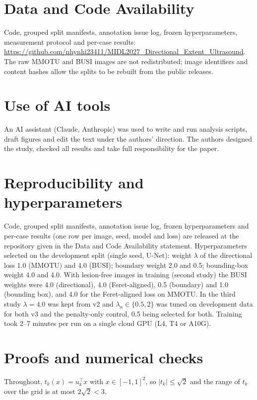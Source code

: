 \documentclass{midl}
\begin{document}
\section*{Data and Code Availability}
Code, grouped split manifests, annotation issue log, frozen hyperparameters, measurement protocol and per-case results: \url{https://github.com/nhynhi23411/MIDL2027_Directional_Extent_Ultrasound}. The raw MMOTU and BUSI images are not redistributed; image identifiers and content hashes allow the splits to be rebuilt from the public releases.

\section*{Use of AI tools}
An AI assistant (Claude, Anthropic) was used to write and run analysis scripts, draft figures and edit the text under the authors' direction. The authors designed the study, checked all results and take full responsibility for the paper.




\appendix
\section{Reproducibility and hyperparameters}\label{app:repro}
Code, grouped split manifests, annotation issue log, frozen hyperparameters and per-case results (one row per image, seed, model and loss) are released at the repository given in the Data and Code Availability statement. Hyperparameters selected on the development split (single seed, U-Net): weight $\lambda$ of the directional loss 1.0 (MMOTU) and 4.0 (BUSI); boundary weight 2.0 and 0.5; bounding-box weight 4.0 and 4.0. With lesion-free images in training (second study) the BUSI weights were 4.0 (directional), 4.0 (Feret-aligned), 0.5 (boundary) and 1.0 (bounding box), and 4.0 for the Feret-aligned loss on MMOTU. In the third study $\lambda=4.0$ was kept from v2 and $\lambda_n\in\{0.5,2\}$ was tuned on development data for both v3 and the penalty-only control, 0.5 being selected for both. Training took 2--7 minutes per run on a single cloud GPU (L4, T4 or A10G).

\section{Proofs and numerical checks}\label{app:proofs}
Throughout, $t_k(x)=u_k^\top x$ with $x\in[-1,1]^2$, so $|t_k|\le\sqrt2$ and the range of $t_k$ over the grid is at most $2\sqrt2<3$.
\end{document}
